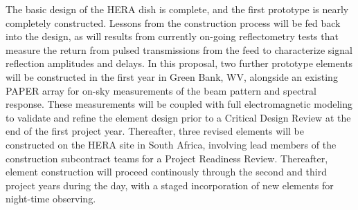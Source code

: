 \documentclass[preprint]{aastex}
\begin{document}
The basic design of the HERA dish
is complete, and the first prototype is nearly completely constructed.  Lessons from the
construction process will be fed back into the design, as will results from currently
on-going reflectometry tests that measure the return from pulsed transmissions from the
feed to characterize signal reflection amplitudes and delays.  In this proposal,
two further prototype elements will be constructed in the first year in Green Bank, WV,
alongside an existing PAPER array for on-sky measurements of the beam pattern and spectral 
response.
These measurements will be coupled with full electromagnetic modeling to validate
and refine the element design prior to a Critical Design Review at the end of the first project
year.  Thereafter, three revised elements will be constructed on the HERA site in South Africa, involving
lead members of the construction subcontract teams for a Project Readiness Review.  Thereafter,
element construction will proceed continously through the second and third project years during the day,
with a staged incorporation of new elements for night-time observing.




\end{document}
